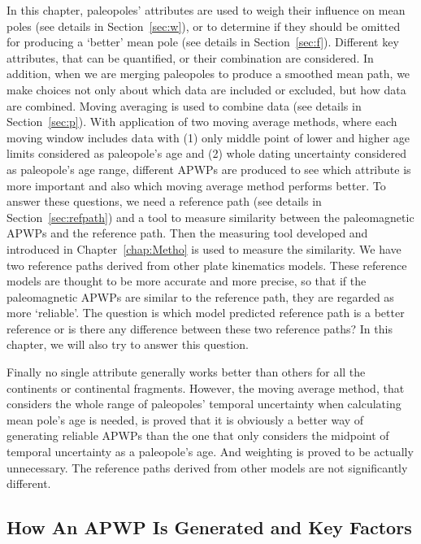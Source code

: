 In this chapter, paleopoles' attributes are used to weigh their influence on
mean poles (see details in Section~\ref{sec:w}), or to determine if they should
be omitted for producing a `better' mean pole (see details in
Section~\ref{sec:f}). Different key attributes, that can be quantified, or their
combination are considered. In addition, when we are merging paleopoles to
produce a smoothed mean path, we make choices not only about which data are
included or excluded, but how data are combined. Moving averaging is used to
combine data (see details in Section~\ref{sec:p}). With application of two
moving average methods, where each moving window includes data with (1) only
middle point of lower and higher age limits considered as paleopole's age and
(2) whole dating uncertainty considered as paleopole's age range, different
APWPs are produced to see which attribute is more important and also which
moving average method performs better. To answer these questions, we need a
reference path (see details in Section~\ref{sec:refpath}) and a tool to measure
similarity between the paleomagnetic APWPs and the reference path. Then the
measuring tool developed and introduced in Chapter~\ref{chap:Metho} is used to
measure the similarity. We have two reference paths derived from other plate
kinematics models. These reference models are thought to be more accurate and
more precise, so that if the paleomagnetic APWPs are similar to the reference
path, they are regarded as more `reliable'. The question is which model
predicted reference path is a better reference or is there any difference
between these two reference paths? In this chapter, we will also try to answer
this question.

Finally no single attribute generally works better than others for all the
continents or continental fragments. However, the moving average method, that
considers the whole range of paleopoles' temporal uncertainty when calculating
mean pole's age is needed, is proved that it is obviously a better way of
generating reliable APWPs than the one that only considers the midpoint of
temporal uncertainty as a paleopole's age. And weighting is proved to be
actually unnecessary. The reference paths derived from other models are not
significantly different.

\subsection{How An APWP Is Generated and Key Factors}

